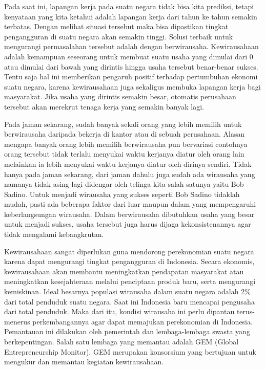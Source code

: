 \documentclass[a4paper,twoside]{article}
\begin{document}
Pada saat ini, lapangan kerja pada suatu negara tidak bisa kita prediksi, tetapi kenyataan yang kita ketahui adalah lapangan kerja dari tahun ke tahun semakin terbatas. Dengan melihat situasi tersebut maka bisa dipastikan tingkat pengangguran di suatu negara akan semakin tinggi. Solusi terbaik untuk mengurangi permasalahan tersebut adalah dengan berwirausaha. Kewirausahaan adalah kemampuan seseorang untuk membuat suatu usaha yang dimulai dari 0 atau dimulai dari bawah yang dirintis hingga usaha tersebut benar-benar sukses. Tentu saja hal ini memberikan pengaruh positif terhadap pertumbuhan ekonomi suatu negara, karena kewirausahaan juga sekaligus membuka lapangan kerja bagi masyarakat. Jika usaha yang dirintis semakin besar, otomatis perusahaan tersebut akan merekrut tenaga kerja yang semakin banyak lagi. 

 
Pada jaman sekarang, sudah banyak sekali orang yang lebih memilih untuk berwirausaha daripada bekerja di kantor atau di sebuah perusahaan. Alasan mengapa banyak orang lebih memilih berwirausaha pun bervariasi contohnya orang tersebut tidak terlalu menyukai waktu kerjanya diatur oleh orang lain melainkan ia lebih menyukai waktu kerjanya diatur oleh dirinya sendiri. Tidak hanya pada jaman sekarang, dari jaman dahulu juga sudah ada wirausaha yang namanya tidak asing lagi didengar oleh telinga kita salah satunya yaitu Bob Sadino. Untuk menjadi wirausaha yang sukses seperti Bob Sadino tidaklah mudah, pasti ada beberapa faktor dari luar maupun dalam yang mempengaruhi keberlangsungan wirausaha. Dalam berwirausaha dibutuhkan usaha yang besar untuk menjadi sukses, usaha tersebut juga harus dijaga kekonsistenannya agar tidak mengalami kebangkrutan.


Kewirausahaan sangat diperlukan guna mendorong perekonomian suatu negara karena dapat mengurangi tingkat pengangguran di Indonesia. Secara ekonomis, kewirausahaan akan membantu meningkatkan pendapatan masyarakat atau meningkatkan kesejahteraan melalui penciptaan produk baru, serta mengurangi kemiskinan.  Ideal besarnya populasi wirausaha dalam suatu negara adalah 2\% dari total penduduk suatu negara. Saat ini Indonesia baru mencapai pengusaha dari total penduduk. Maka dari itu, kondisi wirausaha ini perlu dipantau terus-menerus perkembangannya agar dapat memajukan perekonomian di Indonesia. Pemantauan ini dilakukan oleh pemerintah dan lembaga-lembaga swasta yang berkepentingan. Salah satu lembaga yang memantau adalah GEM (Global Entrepreneurship Monitor). GEM merupakan konsorsium yang bertujuan untuk mengukur dan memantau kegiatan kewirausahaan. 
\end{document}
